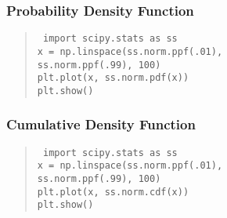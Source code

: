 \begin{frame}
  \frametitle{Probability Density Function}

  \vspace{1cm}
  \begin{quote}
    \tt
    import scipy.stats as ss\\
    x = np.linspace(ss.norm.ppf(.01), \\
    \hspace{1cm}ss.norm.ppf(.99), 100)\\
    plt.plot(x, ss.norm.pdf(x))\\
    plt.show()
  \end{quote}

\end{frame}

\begin{frame}
  \frametitle{Cumulative Density Function}

  \vspace{1cm}
  \begin{quote}
    \tt
    import scipy.stats as ss\\
    x = np.linspace(ss.norm.ppf(.01), \\
    \hspace{1cm}ss.norm.ppf(.99), 100)\\
    plt.plot(x, ss.norm.cdf(x))\\
    plt.show()
  \end{quote}

\end{frame}

